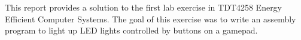 This report provides a solution to the first lab exercise in TDT4258 Energy Efficient
Computer Systems. The goal of this exercise was to write an assembly program to light up LED lights controlled by buttons on a gamepad. 
